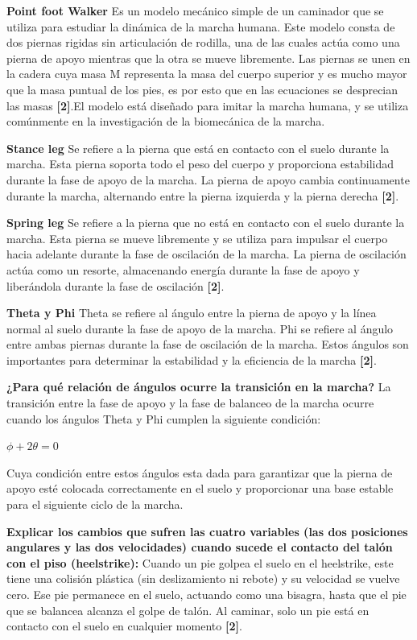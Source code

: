 \documentclass[journal,transmag]{IEEEtran}
\begin{document}
\begin{itemize}
    \textbf{Point foot Walker}
    Es un modelo mecánico simple de un caminador que se utiliza para estudiar la dinámica de la marcha humana. Este modelo consta de dos piernas rigidas sin articulación de rodilla, una de las cuales actúa como una pierna de apoyo mientras que la otra se mueve libremente. Las piernas se unen en la cadera cuya masa M representa la masa del cuerpo superior y es mucho mayor que la masa puntual de los pies, es por esto que en las ecuaciones se desprecian las masas \textbf{[2]}.El modelo está diseñado para imitar la marcha humana, y se utiliza comúnmente en la investigación de la biomecánica de la marcha.

    \textbf{Stance leg}
    Se refiere a la pierna que está en contacto con el suelo durante la marcha. Esta pierna soporta todo el peso del cuerpo y proporciona estabilidad durante la fase de apoyo de la marcha. La pierna de apoyo cambia continuamente durante la marcha, alternando entre la pierna izquierda y la pierna derecha \textbf{[2]}.

    \textbf{Spring leg}
    Se refiere a la pierna que no está en contacto con el suelo durante la marcha. Esta pierna se mueve libremente y se utiliza para impulsar el cuerpo hacia adelante durante la fase de oscilación de la marcha. La pierna de oscilación actúa como un resorte, almacenando energía durante la fase de apoyo y liberándola durante la fase de oscilación \textbf{[2]}.

     \textbf{Theta y Phi}
     Theta se refiere al ángulo entre la pierna de apoyo y la línea normal al suelo durante la fase de apoyo de la marcha. Phi se refiere al ángulo entre ambas piernas durante la fase de oscilación de la marcha. Estos ángulos son importantes para determinar la estabilidad y la eficiencia de la marcha \textbf{[2]}.

    \textbf{¿Para qué relación de ángulos ocurre la transición en la marcha?}
    La transición entre la fase de apoyo y la fase de balanceo de la marcha ocurre cuando los ángulos Theta y Phi cumplen la siguiente condición:
    		
	$\phi + 2\theta = 0 $

	Cuya condición entre estos ángulos esta dada para garantizar que la pierna de apoyo esté colocada correctamente en el suelo y proporcionar una base estable para el siguiente ciclo de la marcha.

    \textbf{Explicar los cambios que sufren las cuatro variables (las dos posiciones angulares y las dos
velocidades) cuando sucede el contacto del talón con el piso (heelstrike):}
 Cuando un pie golpea el suelo en el heelstrike, este tiene una colisión plástica (sin deslizamiento ni rebote) y su velocidad se vuelve cero. Ese pie permanece en el suelo, actuando como una bisagra, hasta que el pie que se balancea alcanza el golpe de talón. Al caminar, solo un pie está en contacto con el suelo en cualquier momento \textbf{[2]}.


\end{itemize}
\end{document}
